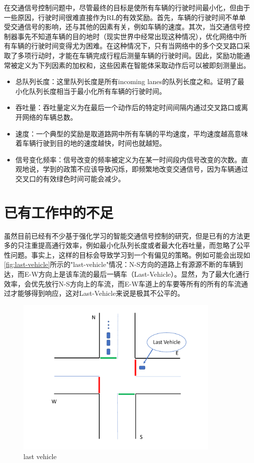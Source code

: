在交通信号控制问题中，尽管最终的目标是使所有车辆的行驶时间最小化，但由于一些原因，行驶时间很难直接作为RL的有效奖励。首先，车辆的行驶时间不单单受交通信号的影响，还与其他的因素有关，例如车辆的速度。其次，当交通信号控制器事先不知道车辆的目的地时（现实世界中经常出现这种情况），优化网络中所有车辆的行驶时间变得尤为困难。在这种情况下，只有当网络中的多个交叉路口采取了多项行动时，才能在车辆完成行程后测量车辆的行驶时间。因此，奖励功能通常被定义为下列因素的加权和，这些因素在智能体采取动作后可以被即刻测量出。
\begin{itemize}
  \item 总队列长度：这里队列长度是所有incoming lanes的队列长度之和。证明了最小化队列长度相当于最小化所有车辆的行驶时间。
  \item 吞吐量：吞吐量定义为在最后一个动作后的特定时间间隔内通过交叉路口或离开网络的车辆总数。
  \item 速度：一个典型的奖励是取道路网中所有车辆的平均速度，平均速度越高意味着车辆行驶到目的地的速度越快，时间也就越短。
  \item 信号变化频率：信号改变的频率被定义为在某一时间段内信号改变的次数。直观地说，学到的政策不应该导致闪烁，即频繁地改变交通信号，因为车辆通过交叉口的有效绿色时间可能会减少。
\end{itemize}
\section{已有工作中的不足}
虽然目前已经有不少基于强化学习的智能交通信号控制的研究，但是已有的方法更多的只注重提高通行效率，例如最小化队列长度或者最大化吞吐量，而忽略了公平性问题。事实上，这样的目标会导致学习到一个有偏见的策略。例如可能会出现如\autoref{fig:last-vehicle}所示的"last-vehicle"情况：N-S方向的道路上有源源不断的车辆到达，而E-W方向上是该车流的最后一辆车（Last-Vehicle）。显然，为了最大化通行效率，会优先放行N-S方向上的车流，而E-W车道上的车要等所有的所有的车流通过才能够得到响应，这对Last-Vehicle来说是极其不公平的。

\begin{figure}[t]
  \includegraphics[width=10cm]{fig/lastvehicle.pdf}
  \caption{last vehicle}
  \label{fig:last-vehicle}
\end{figure}

